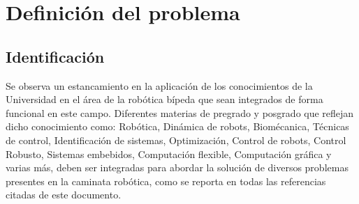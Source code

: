 \mode*
\section[Def. Problema]{Definici\'on del problema}
\label{sec:problema}

\subsection[Identificaci\'on]{Identificaci\'on}
Se observa un estancamiento en la aplicaci\'on de los conocimientos de la Universidad en el \'area de la rob\'otica b\'ipeda que sean integrados de forma funcional en este campo. Diferentes materias de pregrado y posgrado que reflejan dicho conocimiento como: Rob\'otica, Din\'amica de robots, Biom\'ecanica, T\'ecnicas de control, Identificaci\'on de sistemas, Optimizaci\'on, Control de robots, Control Robusto, Sistemas embebidos, Computaci\'on flexible, Computaci\'on gr\'afica y varias m\'as, deben ser integradas para abordar la soluci\'on de diversos problemas presentes en la caminata rob\'otica, como se reporta en todas las referencias citadas de este documento.\par

